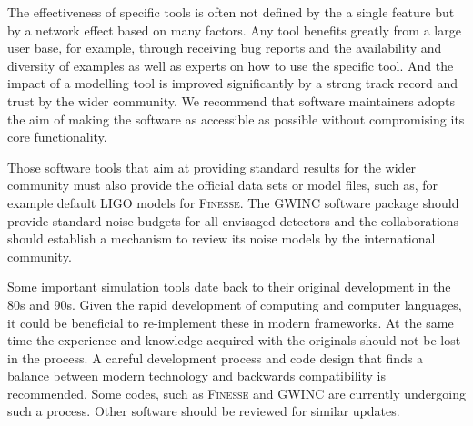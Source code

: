 The effectiveness of specific tools is often not defined by the a single feature but by a network effect based on many factors. Any tool benefits greatly from a large user base, for example, through receiving bug reports and the availability and diversity of examples as well as experts on how to use the specific tool. And the impact of a modelling tool is improved significantly by a strong track record and trust by the wider community. We recommend that software maintainers adopts the aim of making the software as accessible as possible without compromising its core functionality. %

Those software tools that aim at providing standard results for the wider community must also provide the official data sets or model files, such as, for example default LIGO models for \textsc{Finesse}. The GWINC software package should provide standard noise budgets for all envisaged detectors and the
collaborations should establish a mechanism to review its noise models by the international community.

Some important simulation tools date back to their original development in the 80s and 90s. Given the rapid development of computing and computer languages, it could be beneficial to re-implement these in modern frameworks. At the same time the experience and knowledge acquired with the originals should not be lost in the process. A careful development process and code design that finds a balance between modern technology and backwards compatibility
is recommended. Some codes, such as \textsc{Finesse} and GWINC are currently undergoing such a process. Other software should be reviewed for similar updates.

